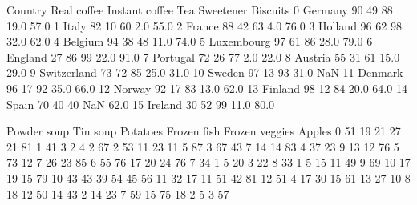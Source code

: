 \documentclass[letterpaper,10pt,english]{jupyterBook}
\begin{document}
\begin{sphinxVerbatim}[commandchars=\\\{\}]
        Country  Real coffee  Instant coffee  Tea  Sweetener  Biscuits  \PYGZbs{}
0       Germany           90              49   88       19.0      57.0   
1         Italy           82              10   60        2.0      55.0   
2        France           88              42   63        4.0      76.0   
3       Holland           96              62   98       32.0      62.0   
4       Belgium           94              38   48       11.0      74.0   
5    Luxembourg           97              61   86       28.0      79.0   
6       England           27              86   99       22.0      91.0   
7      Portugal           72              26   77        2.0      22.0   
8       Austria           55              31   61       15.0      29.0   
9   Switzerland           73              72   85       25.0      31.0   
10       Sweden           97              13   93       31.0       NaN   
11      Denmark           96              17   92       35.0      66.0   
12       Norway           92              17   83       13.0      62.0   
13      Finland           98              12   84       20.0      64.0   
14        Spain           70              40   40        NaN      62.0   
15      Ireland           30              52   99       11.0      80.0   

    Powder soup  Tin soup  Potatoes  Frozen fish  Frozen veggies  Apples  \PYGZbs{}
0            51        19        21           27              21      81   
1            41         3         2            4               2      67   
2            53        11        23           11               5      87   
3            67        43         7           14              14      83   
4            37        23         9           13              12      76   
5            73        12         7           26              23      85   
6            55        76        17           20              24      76   
7            34         1         5           20               3      22   
8            33         1         5           15              11      49   
9            69        10        17           19              15      79   
10           43        43        39           54              45      56   
11           32        17        11           51              42      81   
12           51         4        17           30              15      61   
13           27        10         8           18              12      50   
14           43         2        14           23               7      59   
15           75        18         2            5               3      57   


\end{sphinxVerbatim}
\end{document}
